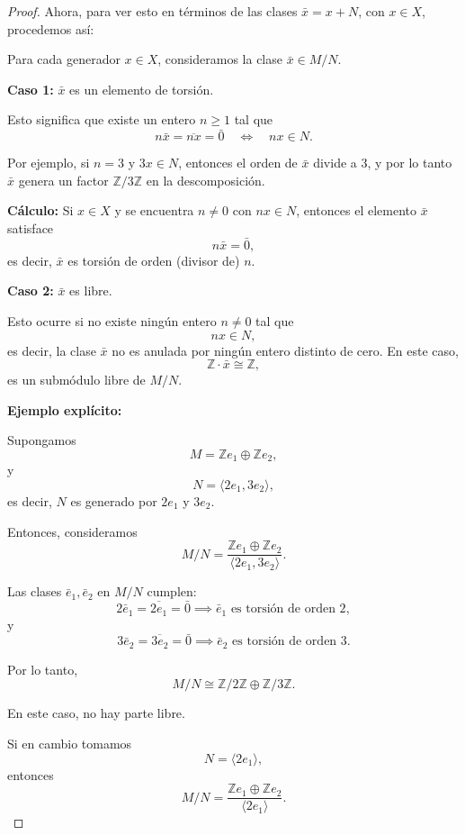 \begin{proof}
	Ahora, para ver esto en términos de las clases \(\bar{x} = x + N\), con \(x \in X\), procedemos así:
	
	\medskip
	
	Para cada generador \(x \in X\), consideramos la clase \(\bar{x} \in M/N\). 
	
	\textbf{Caso 1:} \(\bar{x}\) es un elemento de torsión.
	
	Esto significa que existe un entero \(n \geq 1\) tal que
	\[
	n \bar{x} = \overline{n x} = \bar{0} \quad \Longleftrightarrow \quad n x \in N.
	\]
	
	Por ejemplo, si \(n=3\) y \(3x \in N\), entonces el orden de \(\bar{x}\) divide a 3, y por lo tanto \(\bar{x}\) genera un factor \(\mathbb{Z}/3\mathbb{Z}\) en la descomposición.
	
	\textbf{Cálculo:} Si \(x \in X\) y se encuentra \(n \neq 0\) con \(n x \in N\), entonces el elemento \(\bar{x}\) satisface
	\[
	n \bar{x} = \bar{0},
	\]
	es decir, \(\bar{x}\) es torsión de orden (divisor de) \(n\).
	
	\medskip
	
	\textbf{Caso 2:} \(\bar{x}\) es libre.
	
	Esto ocurre si no existe ningún entero \(n \neq 0\) tal que
	\[
	n x \in N,
	\]
	es decir, la clase \(\bar{x}\) no es anulada por ningún entero distinto de cero. En este caso,
	\[
	\mathbb{Z} \cdot \bar{x} \cong \mathbb{Z},
	\]
	es un submódulo libre de \(M/N\).
	
	\medskip
	
	\textbf{Ejemplo explícito:}
	
	Supongamos
	\[
	M = \mathbb{Z} e_1 \oplus \mathbb{Z} e_2,
	\]
	y
	\[
	N = \langle 2 e_1, 3 e_2 \rangle,
	\]
	es decir, \(N\) es generado por \(2 e_1\) y \(3 e_2\).
	
	Entonces, consideramos
	\[
	M/N = \frac{\mathbb{Z} e_1 \oplus \mathbb{Z} e_2}{\langle 2 e_1, 3 e_2 \rangle}.
	\]
	
	Las clases \(\bar{e}_1, \bar{e}_2\) en \(M/N\) cumplen:
	\[
	2 \bar{e}_1 = \overline{2 e_1} = \bar{0} \implies \bar{e}_1 \text{ es torsión de orden 2},
	\]
	y
	\[
	3 \bar{e}_2 = \overline{3 e_2} = \bar{0} \implies \bar{e}_2 \text{ es torsión de orden 3}.
	\]
	
	Por lo tanto,
	\[
	M/N \cong \mathbb{Z}/2\mathbb{Z} \oplus \mathbb{Z}/3\mathbb{Z}.
	\]
	
	En este caso, no hay parte libre.
	
	\medskip
	
	Si en cambio tomamos
	\[
	N = \langle 2 e_1 \rangle,
	\]
	entonces
	\[
	M/N = \frac{\mathbb{Z} e_1 \oplus \mathbb{Z} e_2}{\langle 2 e_1 \rangle}.
	\]
	

\end{proof}
